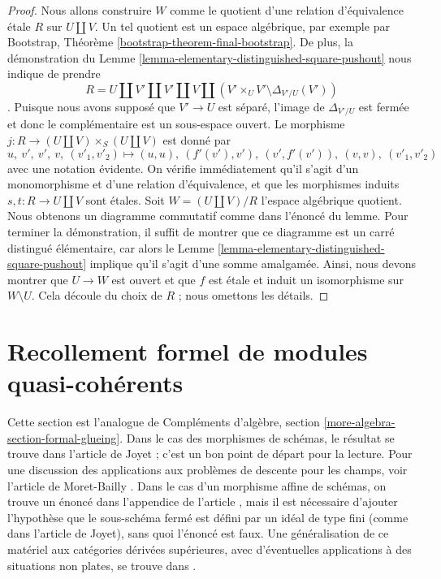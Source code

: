 \begin{proof}
Nous allons construire $W$ comme le quotient d'une relation d'équivalence \'etale $R$ sur $U \amalg V$. Un tel quotient est un espace algébrique, par exemple par Bootstrap, Théorème \ref{bootstrap-theorem-final-bootstrap}.
De plus, la démonstration du Lemme \ref{lemma-elementary-distinguished-square-pushout} nous indique de prendre $$
R = U \amalg V' \amalg V' \amalg V \amalg
(V' \times_U V' \setminus \Delta_{V'/U}(V'))
$$.
Puisque nous avons supposé que $V' \to U$ est séparé, l'image de $\Delta_{V'/U}$ est fermée et donc le complémentaire est un sous-espace ouvert. Le morphisme $j : R \to (U \amalg V) \times_S (U \amalg V)$ est donné par $$
u,\ v',\ v',\ v,\ (v'_1, v'_2) \mapsto
(u, u),\ (f'(v'), v'),\ (v', f'(v')),\ (v, v),\ (v'_1, v'_2)
$$ avec une notation évidente. On vérifie immédiatement qu'il s'agit d'un monomorphisme et d'une relation d'équivalence, et que les morphismes induits $s, t : R \to U \amalg V$ sont \'etales. Soit $W = (U \amalg V)/R$ l'espace algébrique quotient.
Nous obtenons un diagramme commutatif comme dans l'énoncé du lemme.
Pour terminer la démonstration, il suffit de montrer que ce diagramme est un carré distingué élémentaire, car alors le
Lemme \ref{lemma-elementary-distinguished-square-pushout} implique qu'il s'agit d'une somme amalgamée.  
Ainsi, nous devons montrer que $U \to W$ est ouvert et que  
$f$ est \'etale et induit un isomorphisme sur $W \setminus U$.  
Cela découle du choix de $R$ ; nous omettons les détails.  
\end{proof}






\section{Recollement formel de modules quasi-cohérents}
\label{section-formal-glueing}

\noindent
Cette section est l'analogue de
Compléments d'algèbre, section \ref{more-algebra-section-formal-glueing}.
Dans le cas des morphismes de schémas, le résultat se trouve dans
l'article de Joyet \cite{Joyet} ; c'est un bon point de départ pour la lecture.
Pour une discussion des applications aux problèmes de descente pour les champs, voir
l'article de Moret-Bailly \cite{MB}. Dans le cas d'un morphisme affine de schémas, on trouve un énoncé dans l'appendice de l'article
\cite{Ferrand-Raynaud}, mais il est nécessaire d'ajouter l'hypothèse
que le sous-schéma fermé est défini par un idéal de type fini (comme dans l'article de Joyet), sans quoi l'énoncé est faux.
Une généralisation de ce matériel aux catégories dérivées supérieures, avec d'éventuelles applications à des situations non plates,
se trouve dans \cite[section 5]{Bhatt-Algebraize}.

